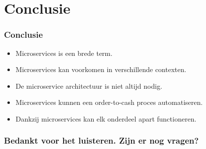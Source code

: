 \documentclass[aspectratio=169]{beamer}
\begin{document}

\section{Conclusie}

\begin{frame}
\frametitle{Conclusie}
	\begin{itemize}
		\item Microservices is een brede term.
		\item Microservices kan voorkomen in verschillende contexten.
		\item De microservice architectuur is niet altijd nodig.
		\item Microservices kunnen een order-to-cash proces automatiseren.
		\item Dankzij microservices kan elk onderdeel apart functioneren.
	\end{itemize}

\end{frame}

\begin{frame}
	\frametitle{Bedankt voor het luisteren. Zijn er nog vragen?}
\end{frame}
\end{document}
